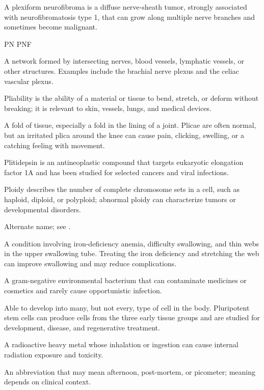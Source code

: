  A plexiform neurofibroma is a diffuse nerve-sheath tumor, strongly associated with neurofibromatosis type 1, that can grow along multiple nerve branches and sometimes become malignant.

\synonyms
PN
PNF

 A network formed by intersecting nerves, blood vessels, lymphatic vessels, or other structures. Examples include the brachial nerve plexus and the celiac vascular plexus.

 Pliability is the ability of a material or tissue to bend, stretch, or deform without breaking; it is relevant to skin, vessels, lungs, and medical devices.

 A fold of tissue, especially a fold in the lining of a joint. Plicae are often normal, but an irritated plica around the knee can cause pain, clicking, swelling, or a catching feeling with movement.

 Plitidepsin is an antineoplastic compound that targets eukaryotic elongation factor 1A and has been studied for selected cancers and viral infections.

 Ploidy describes the number of complete chromosome sets in a cell, such as haploid, diploid, or polyploid; abnormal ploidy can characterize tumors or developmental disorders.

 Alternate name; see .

 A condition involving iron-deficiency anemia, difficulty swallowing, and thin webs in the upper swallowing tube. Treating the iron deficiency and stretching the web can improve swallowing and may reduce complications.

 A gram-negative environmental bacterium that can contaminate medicines or cosmetics and rarely cause opportunistic infection.

 Able to develop into many, but not every, type of cell in the body. Pluripotent stem cells can produce cells from the three early tissue groups and are studied for development, disease, and regenerative treatment.

 A radioactive heavy metal whose inhalation or ingestion can cause internal radiation exposure and toxicity.

 An abbreviation that may mean afternoon, post-mortem, or picometer; meaning depends on clinical context.

